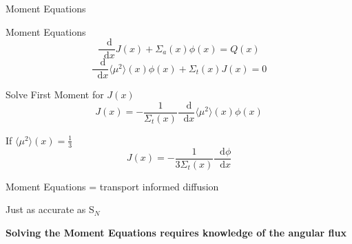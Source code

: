 \documentclass[10pt]{beamer}
\newcommand{\SN}{S$_N$\xspace}
\newcommand{\ud}{\mathop{}\!\mathrm{d}} %
\newcommand{\dderiv}[2]{\frac{\ud #1}{\ud #2}}
\newcommand{\edd}{\langle \mu^2 \rangle}
\begin{document}
\begin{frame}{Moment Equations}

	\begin{block}{Moment Equations}
	\begin{equation*}
		\dderiv{}{x} J(x) + \Sigma_a(x) \phi(x) = Q(x) \tag{\footnotesize Zeroth Moment}
	\end{equation*}
	\begin{equation*}
		\dderiv{}{x} \edd(x) \phi(x) 
		+ \Sigma_t(x) J(x) = 0 
        \tag{\footnotesize First Moment}
	\end{equation*}
	\end{block}

	\pause
	Solve First Moment for $J(x)$ 
	\begin{equation*}
		J(x) = -\frac{1}{\Sigma_t(x)} \dderiv{}{x} \edd(x) \phi(x)
	\end{equation*}

    \pause
    If $\edd(x) = \frac{1}{3}$
    \begin{equation*}
        J(x) = -\frac{1}{3\Sigma_t(x)} \dderiv{\phi}{x}
    \end{equation*}

    \pause
    Moment Equations = transport informed diffusion 

    \pause
    Just as accurate as \SN

    \pause
    \textbf{Solving the Moment Equations requires knowledge of the angular flux}



\end{frame}
\end{document}
